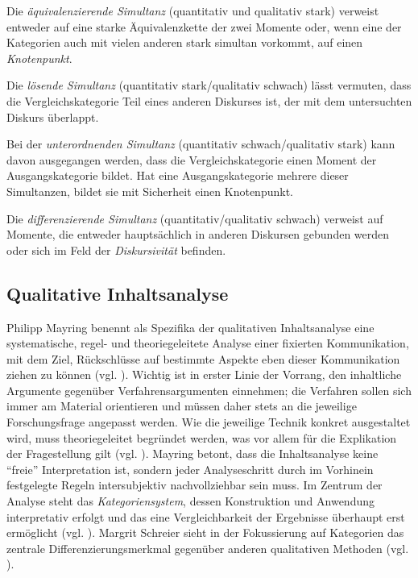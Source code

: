 \documentclass[12pt, titlepage=true, toc=bib]{scrartcl}
\begin{document}
\noindent Die \textit{äquivalenzierende Simultanz} (quantitativ und qualitativ stark) verweist entweder auf eine starke Äquivalenzkette der zwei Momente oder, wenn eine der Kategorien auch mit vielen anderen stark simultan vorkommt, auf einen \textit{Knotenpunkt}.

\noindent Die \textit{lösende Simultanz} (quantitativ stark/qualitativ schwach) lässt vermuten, dass die Vergleichskategorie Teil eines anderen Diskurses ist, der mit dem untersuchten Diskurs überlappt.

\noindent Bei der \textit{unterordnenden Simultanz} (quantitativ schwach/qualitativ stark) kann davon ausgegangen werden, dass die Vergleichskategorie einen Moment der Ausgangskategorie bildet. Hat eine Ausgangskategorie mehrere dieser Simultanzen, bildet sie mit Sicherheit einen Knotenpunkt.

\noindent Die \textit{differenzierende Simultanz} (quantitativ/qualitativ schwach) verweist auf Momente, die entweder hauptsächlich in anderen Diskursen gebunden werden oder sich im Feld der \textit{Diskursivität} befinden.

\subsection{Qualitative Inhaltsanalyse}

Philipp Mayring benennt als Spezifika der qualitativen Inhaltsanalyse eine systematische, regel- und theoriegeleitete Analyse einer fixierten Kommunikation, mit dem Ziel, Rückschlüsse auf bestimmte Aspekte eben dieser Kommunikation ziehen zu können (vgl. \cite*[13]{mayring_qualitative_2010}). Wichtig ist in erster Linie der Vorrang, den inhaltliche Argumente gegenüber Verfahrensargumenten einnehmen; die Verfahren sollen sich immer am Material orientieren und müssen daher stets an die jeweilige Forschungsfrage angepasst werden. Wie die jeweilige Technik konkret ausgestaltet wird, muss theoriegeleitet begründet werden, was vor allem für die Explikation der Fragestellung gilt (vgl. \cite[50-51]{mayring_qualitative_2010}). Mayring betont, dass die Inhaltsanalyse keine "`freie"' Interpretation ist, sondern jeder Analyseschritt durch im Vorhinein festgelegte Regeln intersubjektiv nachvollziehbar sein muss. Im Zentrum der Analyse steht das \textit{Kategoriensystem}, dessen Konstruktion und Anwendung interpretativ erfolgt und das eine Vergleichbarkeit der Ergebnisse überhaupt erst ermöglicht (vgl. \cite[49]{mayring_qualitative_2010}). Margrit Schreier sieht in der Fokussierung auf Kategorien das zentrale Differenzierungsmerkmal gegenüber anderen qualitativen Methoden (vgl. \cite[3]{schreier_varianten_2014}).
\end{document}
